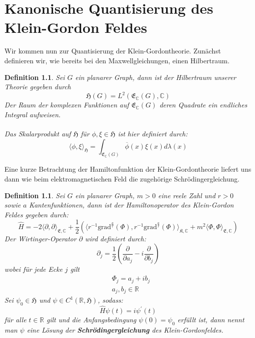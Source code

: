 \documentclass[11pt,a4paper,leqno]{report}
\newtheorem{definition}[theorem]{Definition}
\numberwithin{equation}{chapter}
\begin{document}
\chapter{Kanonische Quantisierung des Klein-Gordon Feldes}
Wir kommen nun zur Quantisierung der Klein-Gordontheorie.
Zun\"achst definieren wir, wie bereits bei den Maxwellgleichungen, einen Hilbertraum.
\begin{definition}
	Sei $G$ ein planarer Graph, dann ist der Hilbertraum unserer Theorie gegeben durch
	\begin{equation}
		\mathfrak{H}(G) = L^2(\mathfrak{E}_\mathbb{C}(G),\mathbb{C})
	\end{equation}
	Der Raum der komplexen Funktionen auf $\mathfrak{E}_\mathbb{C}(G)$ deren Quadrate ein endliches Integral aufweisen.\\
	\\
	Das Skalarprodukt auf $\mathfrak{H}$ f\"ur $\phi,\xi\in \mathfrak{H}$ ist hier definiert durch:
	\begin{equation}
		\langle \phi, \xi\rangle_{\mathfrak{H}} = \int_{\mathfrak{E}_\mathbb{C}(G)} \overline{\phi}(x)\xi(x)d\lambda(x)
	\end{equation}
\end{definition}
\noindent
Eine kurze Betrachtung der Hamiltonfunktion der Klein-Gordontheorie liefert uns dann wie beim elektromagnetischen Feld die zugeh\"orige Schr\"odingergleichung.
\begin{definition}
	Sei $G$ ein planarer Graph, $m>0$ eine reele Zahl und $r>0$ sowie $a$ Kantenfunktionen, dann ist der Hamiltonoperator des Klein-Gordon Feldes gegeben durch:
	\begin{equation}
		\hat{H}=-2\langle\partial,\partial\rangle_{\mathfrak{E},\mathbb{C}} + \frac{1}{2}(\langle r^{-1}\text{grad}^{\frac{a}{r}}(\Phi), r^{-1}\text{grad}^{\frac{a}{r}}(\Phi)\rangle_{\mathfrak{K},\mathbb{C}}+ m^2\langle\Phi, \Phi\rangle_{\mathfrak{E},\mathbb{C}})
	\end{equation}
	Der Wirtinger-Operator $\partial$ wird definiert durch:
	\begin{equation}
		\partial_j =\frac{1}{2}(\frac{\partial}{\partial a_j} - i\frac{\partial}{\partial b_j})
	\end{equation}
	wobei f\"ur jede Ecke $j$ gilt
	\begin{align*}
	&\Phi_j = a_j + ib_j\\
	&a_j, b_j\in \mathbb{R}
	\end{align*}
	Sei $\psi_0\in\mathfrak{H}$ und $\psi\in C^1(\mathbb{R},\mathfrak{H})$, sodass:
	\begin{equation}
		\hat{H}\psi(t) = i\psi^\prime(t)
	\end{equation}
	f\"ur alle $t\in\mathbb{R}$ gilt und die Anfangsbedingung $\psi(0)=\psi_0$ erf\"ullt ist, dann nennt man $\psi$ eine L\"osung der
	\textbf{Schr\"odingergleichung} des Klein-Gordonfeldes.
\end{definition}
\end{document}
